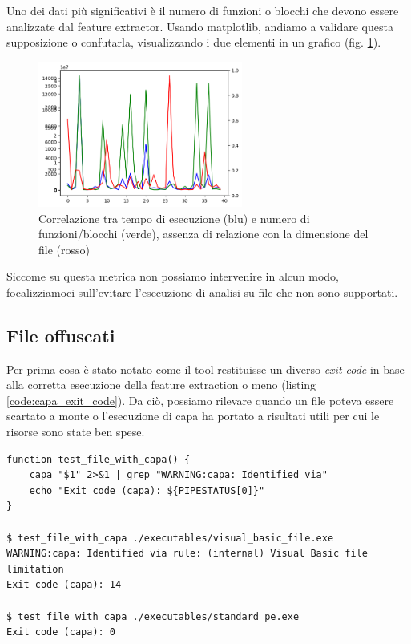 Uno dei dati più significativi è il numero di funzioni o blocchi che devono essere analizzate dal feature extractor.
Usando matplotlib, andiamo a validare questa supposizione o confutarla, visualizzando i due elementi in un grafico (fig. \ref{fig:capa_correlation_plot}).

\begin{figure}[!htb]
    \centering
    \includegraphics[width=0.6\textwidth]{assets/capa_correlation_plot.png}
    \caption{Correlazione tra tempo di esecuzione (blu) e numero di funzioni/blocchi (verde), assenza di relazione con la dimensione del file (rosso)}
    \label{fig:capa_correlation_plot}
\end{figure}

Siccome su questa metrica non possiamo intervenire in alcun modo, focalizziamoci sull'evitare l'esecuzione di analisi su file che non sono supportati.


\subsection{File offuscati}
\label{chap:static_analysis_obfuscated}
Per prima cosa è stato notato come il tool restituisse un diverso \emph{exit code} in base alla corretta esecuzione della feature extraction o meno (listing \ref{code:capa_exit_code}). Da ciò, possiamo rilevare quando un file poteva essere scartato a monte o l'esecuzione di capa ha portato a risultati utili per cui le risorse sono state ben spese.

\begin{code}
\caption{Distinzione tra gli exit code di capa}
\begin{verbatim}
function test_file_with_capa() {
    capa "$1" 2>&1 | grep "WARNING:capa: Identified via"
    echo "Exit code (capa): ${PIPESTATUS[0]}"
}

$ test_file_with_capa ./executables/visual_basic_file.exe
WARNING:capa: Identified via rule: (internal) Visual Basic file limitation
Exit code (capa): 14

$ test_file_with_capa ./executables/standard_pe.exe
Exit code (capa): 0
\end{verbatim}
\label{code:capa_exit_code}
\end{code}

